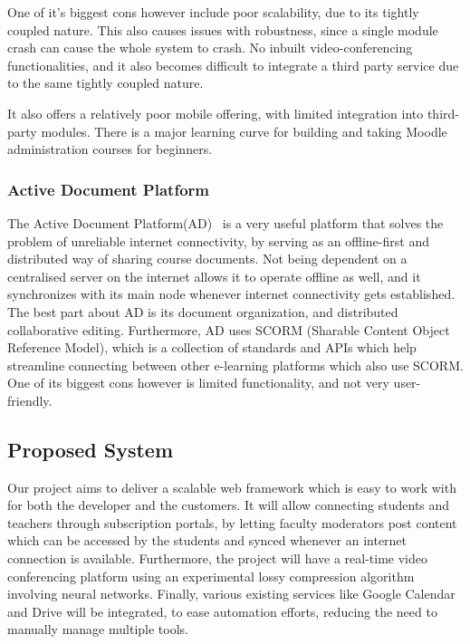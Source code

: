 One of it’s biggest cons however include poor scalability, due to its tightly coupled nature. 
This also causes issues with robustness, since a single module crash can cause the whole system to crash. 
No inbuilt video-conferencing functionalities, and it also becomes difficult to integrate a 
third party service due to the same tightly coupled nature.

It also offers a relatively poor mobile offering, with limited integration into third-party modules. 
There is a major learning curve for building and taking Moodle administration courses for beginners.

\subsubsection{Active Document Platform}
The Active Document Platform(AD)~\cite{ActiveDocument} is a very useful platform that 
solves the problem of unreliable internet connectivity, by serving as an offline-first 
and distributed way of sharing course documents. Not being dependent on a centralised 
server on the internet allows it to operate offline as well, and it synchronizes with 
its main node whenever internet connectivity gets established. The best part about AD 
is its document organization, and distributed collaborative editing. Furthermore, AD 
uses SCORM (Sharable Content Object Reference Model), which is a collection of standards 
and APIs which help streamline connecting between other e-learning platforms which also 
use SCORM. One of its biggest cons however is limited functionality, and not very user-friendly.

\subsection{Proposed System}

Our project aims to deliver a scalable web framework which is easy to work with 
for both the developer and the customers. It will allow connecting students and teachers 
through subscription portals, by letting faculty moderators post content which can be accessed 
by the students and synced whenever an internet connection is available. 
Furthermore, the project will have a real-time video conferencing platform 
using an experimental lossy compression algorithm involving neural networks. 
Finally, various existing services like Google Calendar and Drive will be integrated, to ease 
automation efforts, reducing the need to manually manage multiple tools.

